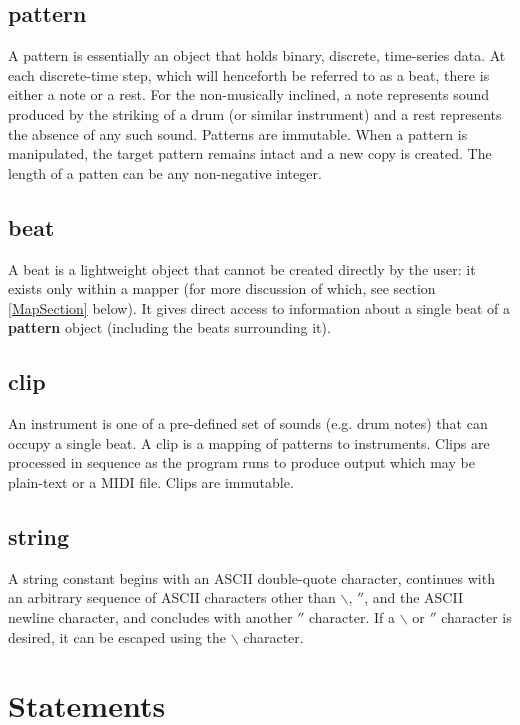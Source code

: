 \subsection{pattern}

A pattern is essentially an object that holds binary, discrete, time-series data.  At each discrete-time step, which will henceforth be referred to as a beat, there is either a note or a rest.  For the non-musically inclined, a note represents sound produced by the striking of a drum (or similar instrument) and a rest represents the absence of any such sound.  Patterns are immutable.  When a pattern is manipulated, the target pattern remains intact and a new copy is created.  The length of a patten can be any non-negative integer.

\subsection{beat}

A beat is a lightweight object that cannot be created directly by the user: it exists only within a mapper (for more discussion of which, see section \ref{MapSection} below).  It gives direct access to information about a single beat of a \textbf{pattern} object (including the beats surrounding it).

\subsection{clip}

An instrument is one of a pre-defined set of sounds (e.g. drum notes) that can occupy a single beat.
A clip is a mapping of patterns to instruments. Clips are processed in sequence as the program runs to produce output which may be plain-text or a MIDI file.  Clips are immutable.

\subsection{string}

A string constant begins with an ASCII double-quote character, continues
with an arbitrary sequence of ASCII characters other than $\backslash$, $''$, and the ASCII newline character,
and concludes with another $''$ character.  If a $\backslash$ or $''$ character is
desired, it can be escaped using the $\backslash$ character.

\section{Statements}

